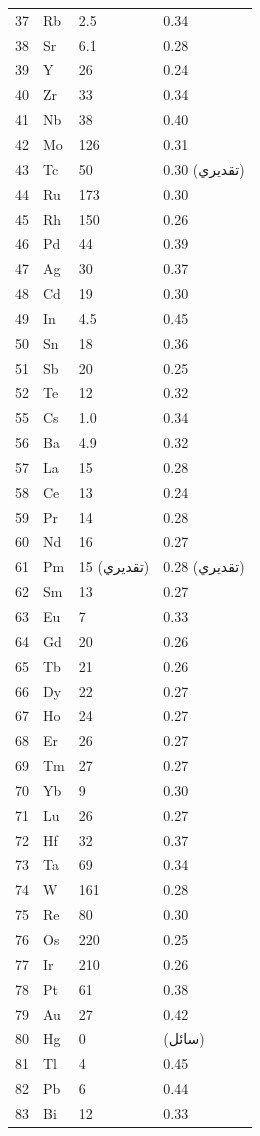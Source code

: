 \documentclass[11pt,a4paper]{article}
\begin{document}
\begin{otherlanguage}{arabic}
\begin{longtable}{p{0.6cm}p{1.2cm}p{1.5cm}p{1.5cm}}
			37 & Rb & 2.5 & 0.34 \\
			38 & Sr & 6.1 & 0.28 \\
			39 & Y  & 26 & 0.24 \\
			40 & Zr & 33 & 0.34 \\
			41 & Nb & 38 & 0.40 \\
			42 & Mo & 126 & 0.31 \\
			43 & Tc & 50 & 0.30 (تقديري) \\
			44 & Ru & 173 & 0.30 \\
			45 & Rh & 150 & 0.26 \\
			46 & Pd & 44 & 0.39 \\
			47 & Ag & 30 & 0.37 \\
			48 & Cd & 19 & 0.30 \\
			49 & In & 4.5 & 0.45 \\
			50 & Sn & 18 & 0.36 \\
			51 & Sb & 20 & 0.25 \\
			52 & Te & 12 & 0.32 \\
			55 & Cs & 1.0 & 0.34 \\
			56 & Ba & 4.9 & 0.32 \\
			57 & La & 15 & 0.28 \\
			58 & Ce & 13 & 0.24 \\
			59 & Pr & 14 & 0.28 \\
			60 & Nd & 16 & 0.27 \\
			61 & Pm & 15 (تقديري) & 0.28 (تقديري) \\
			62 & Sm & 13 & 0.27 \\
			63 & Eu & 7 & 0.33 \\
			64 & Gd & 20 & 0.26 \\
			65 & Tb & 21 & 0.26 \\
			66 & Dy & 22 & 0.27 \\
			67 & Ho & 24 & 0.27 \\
			68 & Er & 26 & 0.27 \\
			69 & Tm & 27 & 0.27 \\
			70 & Yb & 9 & 0.30 \\
			71 & Lu & 26 & 0.27 \\
			72 & Hf & 32 & 0.37 \\
			73 & Ta & 69 & 0.34 \\
			74 & W  & 161 & 0.28 \\
			75 & Re & 80 & 0.30 \\
			76 & Os & 220 & 0.25 \\
			77 & Ir & 210 & 0.26 \\
			78 & Pt & 61 & 0.38 \\
			79 & Au & 27 & 0.42 \\
			80 & Hg & 0 & (سائل) \\
			81 & Tl & 4 & 0.45 \\
			82 & Pb & 6 & 0.44 \\
			83 & Bi & 12 & 0.33 \\
			\bottomrule
		\end{longtable}
		

\end{otherlanguage}
\end{document}
